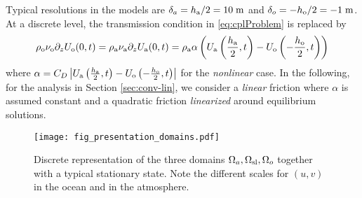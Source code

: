 %
Typical resolutions in the  models are 
$\delta_a=h_{\rm a}/2=10\;{\rm m}$ and $\delta_o=-h_{\rm o}/2=-1\;{\rm m}$.
At a discrete level, the transmission condition in \eqref{eq:cplProblem}
is replaced by
%
\begin{equation}\label{eq:discreteCouplingConditions}
    \rho_{\rm o} \nu_{\rm o} \partial_z U_{\rm o}(0,t)
    = \rho_{\rm a} \nu_{\rm a} \partial_z U_{\rm a}(0,t)
    = \rho_{\rm a} \alpha \left(
    U_{\rm a}\left( \frac{h_{\rm a}}{2},t \right) - U_{\rm o}\left(-\frac{h_{\rm o}}{2},t \right)
    \right)
\end{equation}
%
where 
$\alpha= C_D \left| U_{\rm a}\left( \frac{h_{\rm a}}{2},t \right) - U_{\rm o}\left(-\frac{h_{\rm o}}{2},t \right) \right|$ for the \textit{nonlinear} case.
In the following, for the analysis in Section \ref{sec:conv-lin}, we  consider 
a \textit{linear} friction where $\alpha$ is assumed constant and a 
quadratic friction \textit{linearized} around equilibrium solutions.
\begin{figure}
    \centering
    \texttt{[image: fig\_presentation\_domains.pdf]}
    \caption{Discrete representation of the three domains $\Omega_a, \Omega_{\rm sl}, \Omega_o$ together with a typical stationary state. Note the different scales for $(u,v)$ in the ocean and in the atmosphere.}
    \label{fig:presentationDomains}
\end{figure}
